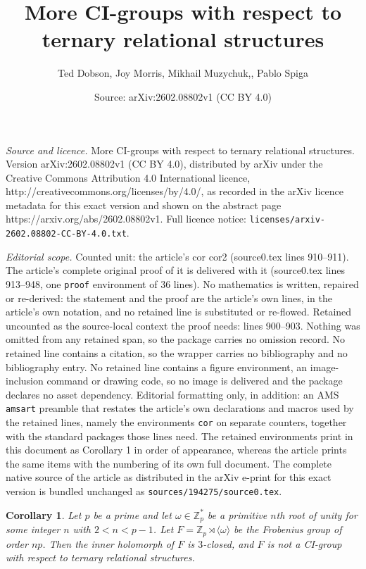 \documentclass[10pt,a4paper]{amsart}
\title{More CI-groups with respect to ternary relational structures}
\author{Ted Dobson, Joy Morris, Mikhail Muzychuk,, Pablo Spiga}
\date{Source: arXiv:2602.08802v1 (CC BY 4.0)}
\newtheorem{cor}{Corollary}
\def\Z{{\mathbb Z}}
\begin{document}
\maketitle

\noindent\emph{Source and licence.} More CI-groups with respect to ternary relational structures. Version arXiv:2602.08802v1 (CC BY 4.0), distributed by arXiv under the Creative Commons Attribution 4.0 International licence, http://creativecommons.org/licenses/by/4.0/, as recorded in the arXiv licence metadata for this exact version and shown on the abstract page https://arxiv.org/abs/2602.08802v1. Full licence notice: \texttt{licenses/arxiv-2602.08802-CC-BY-4.0.txt}.\par\smallskip

\noindent\textit{Editorial scope.} Counted unit: the article's cor cor2 (source0.tex lines 910--911). The article's complete original proof of it is delivered with it (source0.tex lines 913--948, one \texttt{proof} environment of 36 lines). No mathematics is written, repaired or re-derived: the statement and the proof are the article's own lines, in the article's own notation, and no retained line is substituted or re-flowed.  Retained uncounted as the source-local context the proof needs: lines 900--903.  Nothing was omitted from any retained span, so the package carries no omission record.  No retained line contains a citation, so the wrapper carries no bibliography and no bibliography entry.  No retained line contains a figure environment, an image-inclusion command or drawing code, so no image is delivered and the package declares no asset dependency.  Editorial formatting only, in addition: an AMS \texttt{amsart} preamble that restates the article's own declarations and macros used by the retained lines, namely the environments \texttt{cor} on separate counters, together with the standard packages those lines need.  The retained environments print in this document as Corollary 1 in order of appearance, whereas the article prints the same items with the numbering of its own full document.  The complete native source of the article as distributed in the arXiv e-print for this exact version is bundled unchanged as \texttt{sources/194275/source0.tex}.
	\begin{cor}\label{cor1} Let $p$ be a prime and let $\omega \in \Z_p^*$ be a primitive $n$th root of unity for some integer $n$ with $2 < n < p-1$. 
		Let $F = \Z_p \rtimes \langle \omega \rangle$ be the Frobenius group of order $np$. 
		Then the inner holomorph of $F$ is $3$-closed, and $F$ is not a CI-group with respect to ternary relational structures.
	\end{cor}
\end{document}
